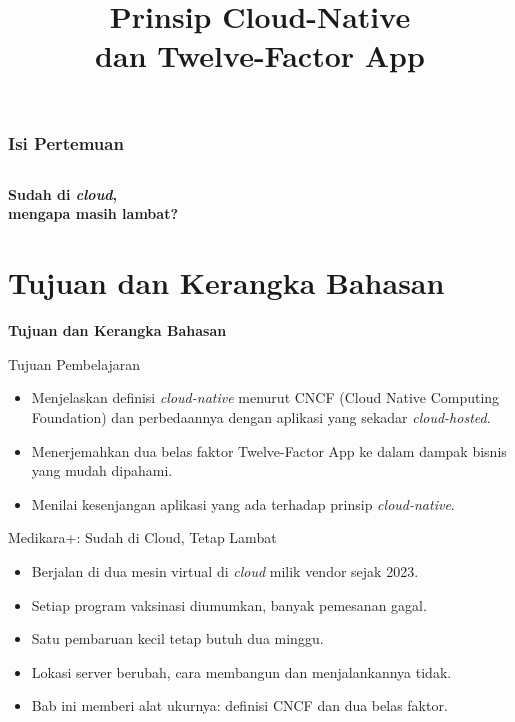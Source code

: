 \documentclass[aspectratio=169, table, 12pt]{beamer}
\title{\Huge Prinsip Cloud-Native\\ \vspace{10pt} dan Twelve-Factor App}
\begin{document}
\frame{\titlepage}

\begin{frame}
  \frametitle{Isi Pertemuan}
  \vspace{14pt}
  \begin{columns}[t]
    {\small\tableofcontents[sections={1-5}]}

    {\small\tableofcontents[sections={6-9}]}
  \end{columns}
\end{frame}

\begin{frame}{\hfill}
  \centering
  \Huge{\textbf{Sudah di \textit{cloud},\\mengapa masih lambat?}}
\end{frame}

\section{Tujuan dan Kerangka Bahasan}

\begin{frame}{\hfill}
  \centering
  \Huge{\textbf{Tujuan dan Kerangka Bahasan}}
\end{frame}

\begin{frame}{{\Large Tujuan Pembelajaran}}
  \vspace{10pt}
  \begin{itemize}
    \item Menjelaskan definisi \textit{cloud-native} menurut CNCF (Cloud Native
          Computing Foundation) dan perbedaannya dengan aplikasi yang sekadar
          \textit{cloud-hosted}.
    \item Menerjemahkan dua belas faktor Twelve-Factor App ke dalam dampak bisnis
          yang mudah dipahami.
    \item Menilai kesenjangan aplikasi yang ada terhadap prinsip
          \textit{cloud-native}.
  \end{itemize}
\end{frame}

\begin{frame}{{\Large Medikara+: Sudah di Cloud, Tetap Lambat}}
  \vspace{10pt}
  \begin{itemize}
    \item Berjalan di dua mesin virtual di \textit{cloud} milik vendor sejak 2023.
    \item Setiap program vaksinasi diumumkan, banyak pemesanan gagal.
    \item Satu pembaruan kecil tetap butuh dua minggu.
    \item Lokasi server berubah, cara membangun dan menjalankannya tidak.
    \item Bab ini memberi alat ukurnya: definisi CNCF dan dua belas faktor.
  \end{itemize}
\end{frame}
\end{document}
